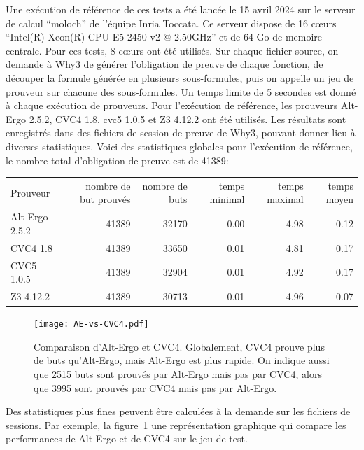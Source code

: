 \documentclass[a4paper,11pt]{article}
\begin{document}
Une exécution de référence de ces tests a été lancée le 15 avril 2024
sur le serveur de calcul ``moloch'' de l'équipe Inria Toccata. Ce
serveur dispose de 16 c{\oe}urs ``Intel(R) Xeon(R) CPU E5-2450 v2 @
2.50GHz'' et de 64 Go de memoire centrale. Pour ces tests, 8 c{\oe}urs
ont été utilisés. Sur chaque fichier source, on demande à Why3 de
générer l'obligation de preuve de chaque fonction, de découper la
formule générée en plusieurs sous-formules, puis on appelle un jeu de
prouveur sur chacune des sous-formules. Un temps limite de 5 secondes est donné à chaque exécution de prouveurs. Pour l'exécution de référence,
les prouveurs Alt-Ergo 2.5.2, CVC4 1.8, cvc5 1.0.5 et Z3 4.12.2 ont
été utilisés. Les résultats sont enregistrés dans des fichiers de
session de preuve de Why3, pouvant donner lieu à diverses
statistiques. Voici des statistiques globales pour l'exécution de
référence, le nombre total d'obligation de preuve est de 41389:
\begin{center}
  \begin{tabular}{|l|r|r|r|r|r|}
  \rowcolor{gray!50} Prouveur
  & \multicolumn{1}{p{0.13\textwidth}|}{nombre de but prouvés }
  & \multicolumn{1}{p{0.13\textwidth}|}{nombre de buts}
  & \multicolumn{1}{p{0.13\textwidth}|}{temps minimal}
  & \multicolumn{1}{p{0.13\textwidth}|}{temps maximal}
  & \multicolumn{1}{p{0.13\textwidth}|}{temps moyen}
  \\
  Alt-Ergo 2.5.2                & 41389 & 32170 &  0.00  & 4.98 &  0.12 \\
  CVC4 1.8                      & 41389 & 33650 &  0.01  & 4.81 &  0.17 \\
  CVC5 1.0.5                    & 41389 & 32904 &  0.01  & 4.92 &  0.17 \\
  Z3 4.12.2                     & 41389 & 30713 &  0.01  & 4.96 &  0.07
\end{tabular}
\end{center}

\begin{figure}
  \centering
  \texttt{[image: AE-vs-CVC4.pdf]}
  \caption{Comparaison d'Alt-Ergo et CVC4. Globalement, CVC4 prouve
    plus de buts qu'Alt-Ergo, mais Alt-Ergo est plus rapide. On
    indique aussi que 2515 buts sont prouvés par Alt-Ergo mais pas par
    CVC4, alors que 3995 sont prouvés par CVC4 mais pas par Alt-Ergo.}
  \label{fig:AEvsCVC4}
\end{figure}

Des statistiques plus fines peuvent être calculées à la demande sur
les fichiers de sessions. Par exemple, la figure~\ref{fig:AEvsCVC4}
une représentation graphique qui compare les performances de Alt-Ergo
et de CVC4 sur le jeu de test.
\end{document}
